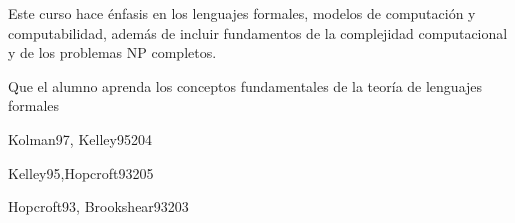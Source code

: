 \begin{syllabus}


\begin{justification}
Este curso hace énfasis en los lenguajes formales, modelos de
computación y computabilidad, además de incluir fundamentos de la
complejidad computacional y de los problemas NP completos.
\end{justification}

\begin{goals}
\item Que el alumno aprenda los conceptos fundamentales de la teoría de lenguajes formales
\end{goals}

\begin{outcomes}
\end{outcomes}

\begin{unit}{\ALBasicComputabilityDef}{Kolman97, Kelley95}{20}{4}
    \ALBasicComputabilityAllTopics
    \ALBasicComputabilityAllObjectives
\end{unit}

\begin{unit}{\ALPversusNPDef}{Kelley95,Hopcroft93}{20}{5}
    \ALPversusNPAllTopics
    \ALPversusNPAllObjectives
\end{unit}

\begin{unit}{\ALAutomataTheoryDef}{Hopcroft93, Brookshear93}{20}{3}
   \ALAutomataTheoryAllTopics
   \ALAutomataTheoryAllObjectives
\end{unit}



\begin{coursebibliography}
\end{coursebibliography}

\end{syllabus}

%
